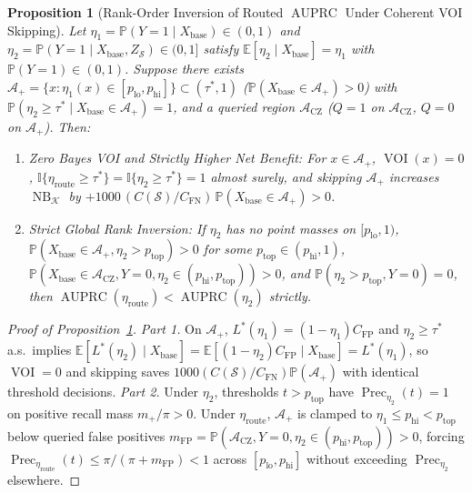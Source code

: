 \documentclass[11pt]{article}
\newtheorem{proposition}{Proposition}
\theoremstyle{remark}
\begin{document}
\begin{proposition}[Rank-Order Inversion of Routed $\operatorname{AUPRC}$ Under Coherent VOI Skipping]
\label{prop:auprc_inversion}
Let $\eta_1 = \mathbb{P}(Y=1 \mid X_{\text{base}}) \in (0,1)$ and $\eta_2 = \mathbb{P}(Y=1 \mid X_{\text{base}}, Z_{\mathcal{S}}) \in (0,1]$ satisfy $\mathbb{E}[\eta_2 \mid X_{\text{base}}] = \eta_1$ with $\mathbb{P}(Y=1) \in (0,1)$. Suppose there exists $\mathcal{A}_+ = \{x : \eta_1(x) \in [p_{\text{lo}}, p_{\text{hi}}]\} \subset (\tau^*, 1)$ ($\mathbb{P}(X_{\text{base}} \in \mathcal{A}_+) > 0$) with $\mathbb{P}(\eta_2 \ge \tau^* \mid X_{\text{base}} \in \mathcal{A}_+) = 1$, and a queried region $\mathcal{A}_{\text{CZ}}$ ($Q=1$ on $\mathcal{A}_{\text{CZ}}$, $Q=0$ on $\mathcal{A}_+$). Then:
\begin{enumerate}
  \item \emph{Zero Bayes VOI and Strictly Higher Net Benefit:} For $x \in \mathcal{A}_+$, $\operatorname{VOI}(x) = 0$, $\mathbb{I}\{\eta_{\text{route}} \ge \tau^*\} = \mathbb{I}\{\eta_2 \ge \tau^*\} = 1$ almost surely, and skipping $\mathcal{A}_+$ increases $\operatorname{NB}_{\mathcal{K}}$ by $+1000\,(C(\mathcal{S})/C_{\text{FN}})\,\mathbb{P}(X_{\text{base}} \in \mathcal{A}_+) > 0$.
  \item \emph{Strict Global Rank Inversion:} If $\eta_2$ has no point masses on $[p_{\text{lo}}, 1)$, $\mathbb{P}(X_{\text{base}} \in \mathcal{A}_+, \eta_2 > p_{\text{top}}) > 0$ for some $p_{\text{top}} \in (p_{\text{hi}}, 1)$, $\mathbb{P}(X_{\text{base}} \in \mathcal{A}_{\text{CZ}}, Y=0, \eta_2 \in (p_{\text{hi}}, p_{\text{top}})) > 0$, and $\mathbb{P}(\eta_2 > p_{\text{top}}, Y=0) = 0$, then $\operatorname{AUPRC}(\eta_{\text{route}}) < \operatorname{AUPRC}(\eta_2)$ strictly.
\end{enumerate}
\end{proposition}

\begin{proof}[Proof of Proposition~\ref{prop:auprc_inversion}]
\emph{Part 1.} On $\mathcal{A}_+$, $L^*(\eta_1) = (1-\eta_1)C_{\text{FP}}$ and $\eta_2 \ge \tau^*$ a.s.\ implies $\mathbb{E}[L^*(\eta_2)\mid X_{\text{base}}] = \mathbb{E}[(1-\eta_2)C_{\text{FP}}\mid X_{\text{base}}] = L^*(\eta_1)$, so $\operatorname{VOI}=0$ and skipping saves $1000(C(\mathcal{S})/C_{\text{FN}})\mathbb{P}(\mathcal{A}_+)$ with identical threshold decisions. \emph{Part 2.} Under $\eta_2$, thresholds $t > p_{\text{top}}$ have $\operatorname{Prec}_{\eta_2}(t)=1$ on positive recall mass $m_+/\pi > 0$. Under $\eta_{\text{route}}$, $\mathcal{A}_+$ is clamped to $\eta_1 \le p_{\text{hi}} < p_{\text{top}}$ below queried false positives $m_{\text{FP}} = \mathbb{P}(\mathcal{A}_{\text{CZ}}, Y=0, \eta_2 \in (p_{\text{hi}}, p_{\text{top}})) > 0$, forcing $\operatorname{Prec}_{\eta_{\text{route}}}(t) \le \pi/(\pi+m_{\text{FP}}) < 1$ across $[p_{\text{lo}}, p_{\text{hi}}]$ without exceeding $\operatorname{Prec}_{\eta_2}$ elsewhere.
\end{proof}
\end{document}
